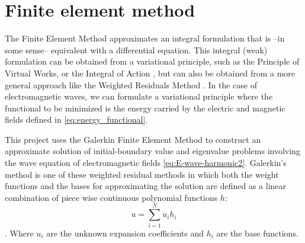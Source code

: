 \chapter{Finite element method}
\label{ch:Finite_element_method}

%
%
%
%
%
%
%
%

The Finite Element Method approximates an integral formulation that is --in some sense-- equivalent with a differential equation. This integral (weak) formulation can be obtained from a variational principle, such as the Principle of Virtual Works, or the Integral of Action \cite{Goldstein2001}, but can also be obtained from a more general approach like the Weighted Residuals Method \cite{Zienkiewicz2005, Reddy_functional_analysis}. In the case of electromagnetic waves, we can formulate a variational principle where the functional to be minimized is the energy carried by the electric and magnetic fields defined in \ref{eq:energy_functional}. 

This project uses the Galerkin Finite Element Method to construct an approximate solution of  initial-boundary value and eigenvalue problems involving the wave equation of electromagnetic fields \ref{eq:E-wave-harmonic2}. Galerkin's method is one of these weighted residual methods in which both the weight functions and the bases for approximating the solution are defined as a linear combination of piece wise continuous polynomial functions $h$: $$u = \sum_{i=1}^Nu_ih_i$$. Where $u_i$ are the unknown expansion coefficients and $h_i$ are the base functions. 

